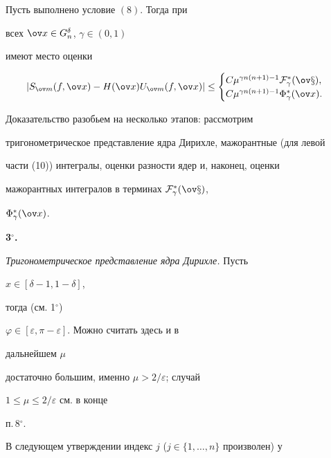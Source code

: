 \begin{thm} Пусть выполнено условие $(8)$. Тогда при 


всех $\ov x\in G^\delta_n$, $\gamma\in(0,1)$ 


имеют место оценки 


\begin{equation} 


|S_{\ov m}(f,\ov x)-H(\ov x)U_{\ov m}(f,\ov x)|\le 


\begin{cases} 


C\mu^{\gamma n(n+1)-1}\cal F^*_\gamma(\ov x),\\ 


C\mu^{\gamma n(n+1)-1}\Phi^*_\gamma(\ov x). 


\end{cases} 


\end{equation} 


\end{thm} 


 


Доказательство разобьем на несколько этапов: рассмотрим 


тригонометрическое представление ядра Дирихле, мажорантные (для левой 


части (10)) интегралы, оценки разности ядер и, наконец, оценки 


мажорантных интегралов в терминах $\cal F^*_\gamma(\ov x)$, 


$\Phi^*_\gamma(\ov x)$. 


\medskip 


 


 


{\bf 3${}^\circ$.} 


{\it Тригонометрическое представление ядра Дирихле.} Пусть 


$x\in[\delta-1,1-\delta]$, 


тогда (см. 1${}^\circ$) 


$\varphi\in[\varepsilon,\pi-\varepsilon]$. Можно считать здесь и в 


дальнейшем $\mu$ 


достаточно большим, именно $\mu>2/\varepsilon$; случай 


$1\le\mu\le 2/\varepsilon$ см. в конце 


п.\,8${}^\circ$. 


В следующем утверждении индекс $j$ ($j\in\{1,\dotsc,n\}$ произволен) у 


